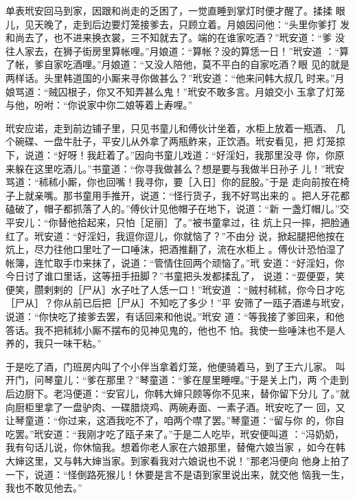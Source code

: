 单表玳安回马到家，因跟和尚走的乏困了，一觉直睡到掌灯时便才醒了。揉揉
眼儿，见天晚了，走到后边要灯笼接爹去，只顾立着。月娘因问他：“头里你爹打
发和尚去了，也不进来换衣裳，三不知就去了。端的在谁家吃酒？”玳安道：“爹
没往人家去，在狮子街房里算帐哩。”月娘道：“算帐？没的算恁一日！”玳安道
：“算了帐，爹自家吃酒哩。”月娘道：“又没人陪他，莫不平白的自家吃酒？眼
见的就是两样话。头里韩道国的小厮来寻你做甚么？”玳安道：“他来问韩大叔几
时来。”月娘骂道：“贼囚根子，你又不知弄甚么鬼！”玳安不敢多言。月娘交小
玉拿了灯笼与他，吩咐：“你说家中你二娘等着上寿哩。”

玳安应诺，走到前边铺子里，只见书童儿和傅伙计坐着，水柜上放着一瓶酒、
几个碗碟、一盘牛肚子，平安儿从外拿了两瓶鲊来，正饮酒。玳安看见，把
灯笼掠下，说道：“好呀！我赶着了。”因向书童儿戏道：“好淫妇，我那里没寻
你，你原来躲在这里吃酒儿。”书童道：“你寻我做甚么？想是要与我做半日孙子
儿！”玳安骂道：“秫秫小厮，你也回嘴！我寻你，要［入日］你的屁股。”于是
走向前按在椅子上就亲嘴。那书童用手推开，说道：“怪行货子，我不好骂出来的
。把人牙花都磕破了，帽子都抓落了人的。”傅伙计见他帽子在地下，说道：“新
一盏灯帽儿。”交平安儿：“你替他拾起来，只怕［足丽］了。”被书童拿过，往
炕上只一摔，把脸通红了。玳安道：“好淫妇，我逗你逗儿，你就恼了？”不由分
说，掀起腿把他按在炕上，尽力往他口里吐了一口唾沫，把酒推翻了，流在水柜上
。傅伙计恐怕湿了帐簿，连忙取手巾来抹了，说道：“管情住回两个顽恼了。”玳
安道：“好淫妇，你今日讨了谁口里话，这等扭手扭脚？”书童把头发都揉乱了，
说道：“耍便耍，笑便笑，臜剌剌的［尸从］水子吐了人恁一口！”玳安道
：“贼村秫秫，你今日才吃［尸从］？你从前已后把［尸从］不知吃了多少！”平
安筛了一瓯子酒递与玳安，说道：“你快吃了接爹去罢，有话回来和他说。”玳安
道：“等我接了爹回来，和他答话。我不把秫秫小厮不摆布的见神见鬼的，他也不
怕。我使一些唾沫也不是人养的，我只一味干粘。”

于是吃了酒，门班房内叫了个小伴当拿着灯笼，他便骑着马，到了王六儿家。
叫开门，问琴童儿：“爹在那里？”琴童道：“爹在屋里睡哩。”于是关上门，两
个走到后边厨下。老冯便道：“安官儿，你韩大婶只顾等你不见来，替你留下分儿
了。”就向厨柜里拿了一盘驴肉、一碟腊烧鸡、两碗寿面、一素子酒。玳安吃了一
回，又让琴童道：“你过来，这酒我吃不了，咱两个噤了罢。”琴童道：“留与你
的，你自吃罢。”玳安道：“我刚才吃了瓯子来了。”于是二人吃毕，玳安便叫道
：“冯奶奶，我有句话儿说，你休恼我。想着你老人家在六娘那里，替俺六娘当家
，如今在韩大婶这里，又与韩大婶当家。到家看我对六娘说也不说！”那老冯便向
他身上拍了一下，说道：“怪倒路死猴儿！休要是言不是语到家里说出来，就交他
恼我一生，我也不敢见他去。”

